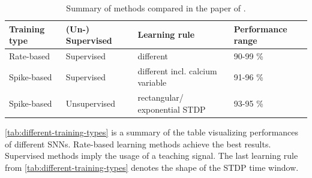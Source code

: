 \begin{table}[]
    \caption{Summary of methods compared in the paper of \authorsSNN{} \cite{SNN}.}
    \begin{tabular}{|l|l|l|l|}
    \hline
    \textbf{Training type} & \textbf{(Un-) Supervised}    & \textbf{Learning rule}               & \textbf{Performance range} \\ \hline
    Rate-based             & Supervised                   & different                            & 90-99 \%                   \\ \hline
    Spike-based            & Supervised                   & different incl. calcium variable & 91-96 \%                   \\ \hline
    Spike-based            & Unsupervised                 & rectangular/ exponential \ac{STDP}        & 93-95 \%                   \\ \hline
    \end{tabular}
    \label{tab:different-training-types}
\end{table}

\autoref{tab:different-training-types} is a summary of the table visualizing performances of different \acp{SNN}.
Rate-based learning methods achieve the best results.
Supervised methods imply the usage of a teaching signal.
The last learning rule from \autoref{tab:different-training-types} denotes the shape of the \ac{STDP} time window.